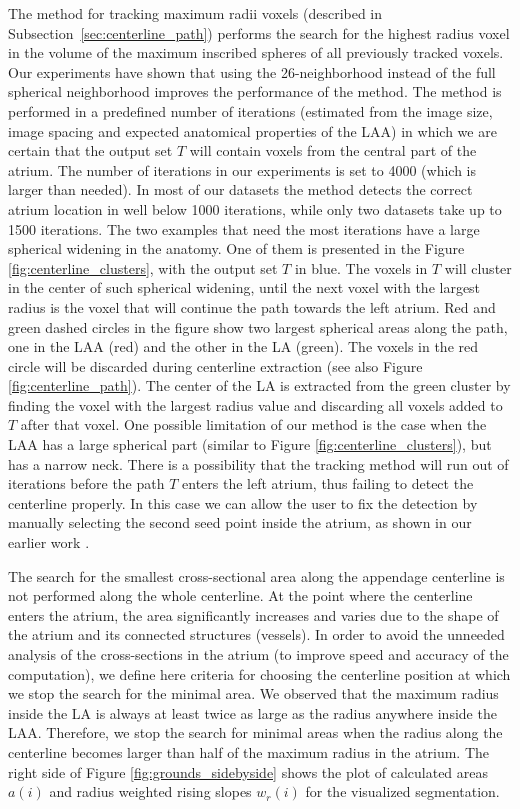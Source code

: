 \documentclass[review]{elsarticle}
\begin{document}
The method for tracking maximum radii voxels (described in
Subsection~\ref{sec:centerline_path}) performs the search for the highest
radius voxel in the volume of the maximum inscribed spheres of all previously
tracked voxels.  
Our experiments have shown that using the 26-neighborhood
instead of the full spherical neighborhood
improves the performance of the method. 
The method is performed in a predefined
number of iterations (estimated from the image size, image spacing and expected
anatomical properties of the LAA) in which we are certain that the output set
$T$ will contain voxels from the central part of the atrium. The number of
iterations in our experiments is set to 4000 (which is larger than needed). In
most of our datasets the method detects the correct atrium location in well below
1000 iterations, while only two datasets take up to 1500 iterations. 
The two examples that need the most iterations have a large spherical widening in the 
anatomy. One of them is presented in the Figure \ref{fig:centerline_clusters}, with the 
output set $T$ in blue.
The voxels in $T$ will cluster in the center of such spherical widening, until
the next voxel with the largest radius is the voxel that will continue the path towards
the left atrium.
Red and green dashed circles in the figure show two largest spherical areas along
the path, one in the LAA (red) and the other in the LA (green). The voxels in the 
red circle will be discarded during centerline extraction 
(see also Figure \ref{fig:centerline_path}).
The center of the LA is extracted from the green cluster by finding the voxel
with the largest radius value and discarding all voxels added to $T$ after that voxel.
One possible limitation of our method is the case when the LAA has a large spherical part 
(similar to Figure \ref{fig:centerline_clusters}), but has a narrow neck. There is 
a possibility that the tracking method will run out of iterations before the path
$T$ enters the left atrium, thus failing to detect the centerline properly.
In this case we can allow the user to fix the detection by manually selecting
the second seed point inside the atrium, 
as shown in our earlier work \cite{leventic2017_SemiautomaticLeftAtrial}.


The search for the smallest cross-sectional area along the appendage centerline
is not performed along the whole centerline. At the point where the centerline
enters the atrium, the area significantly increases and varies due to the shape
of the atrium and its connected structures (vessels).  In order to avoid the
unneeded analysis of the cross-sections in the atrium (to improve speed and
accuracy of the computation), we define here criteria for choosing the
centerline position at which we stop the search for the minimal area.  We
observed that the maximum radius inside the LA is always at least twice as
large as the radius anywhere inside the LAA. Therefore, we stop the search for
minimal areas when the radius along the centerline becomes larger than half of
the maximum radius in the atrium.  The right side of Figure
\ref{fig:grounds_sidebyside} shows the plot of calculated areas $a(i)$ and
radius weighted rising slopes $w_r(i)$ for the visualized segmentation. 
\end{document}
